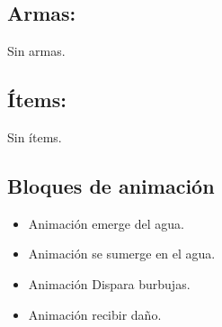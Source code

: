 \subsection{Armas:}
Sin armas.
\subsection{Ítems:}
Sin ítems.
\subsection{Bloques de animación}
	\begin{itemize}
		\item Animación emerge del agua.
		\item Animación se sumerge en el agua.
		\item Animación Dispara burbujas.  
		\item Animación recibir daño.
	\end{itemize}